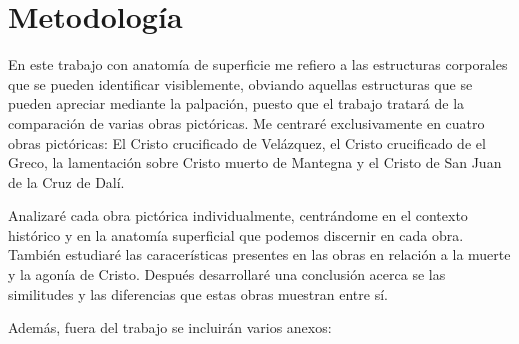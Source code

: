 \section{Metodología}
En este trabajo con anatomía de superficie me refiero a las estructuras corporales que se pueden identificar visiblemente, obviando aquellas estructuras que se pueden apreciar mediante la palpación, puesto que el trabajo tratará de la comparación de varias obras pictóricas. Me centraré exclusivamente en cuatro obras pictóricas: El Cristo crucificado de Velázquez, el Cristo crucificado de el Greco, la lamentación sobre Cristo muerto de Mantegna %
y el Cristo de San Juan de la Cruz de Dalí.


Analizaré cada obra pictórica individualmente, centrándome en el contexto histórico y en la anatomía superficial que podemos discernir en cada obra. También estudiaré las caracerísticas presentes en las obras en relación a la muerte y la agonía de Cristo. Después desarrollaré una conclusión acerca se las similitudes y las diferencias que estas obras muestran entre sí.

Además, fuera del trabajo se incluirán varios anexos: